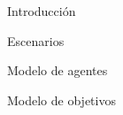 \documentclass[11pt, a4paper,spanish]{article}
\begin{document}
    


    \thispagestyle{empty}
    \tableofcontents
    \pagebreak


\begin{section}{Introducción}
        
\end{section}
\pagebreak


\begin{section}{Escenarios}
        
\end{section}
\pagebreak


\begin{section}{Modelo de agentes}
        
\end{section}
\pagebreak
\begin{section}{Modelo de objetivos}
        
\end{section}\begin{flushleft}\end{flushleft}

    \pagebreak
%       
\end{document}
